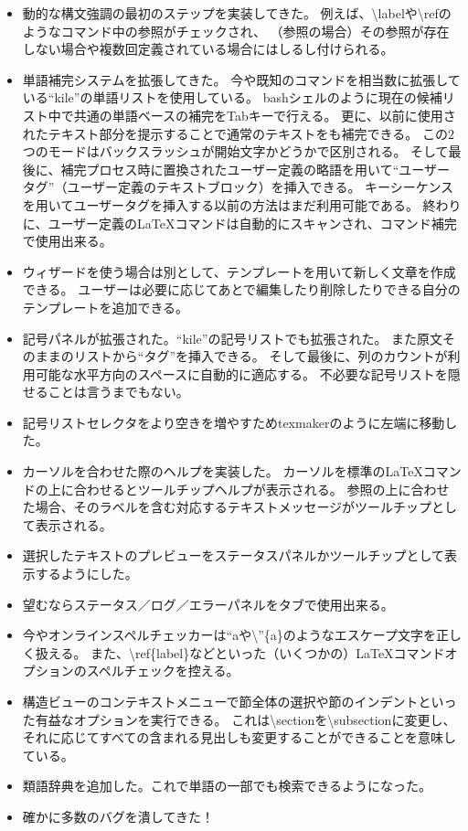 \documentclass[]{book}
\begin{document}
\begin{itemize}
\item
  動的な構文強調の最初のステップを実装してきた。
  例えば、\textbackslash{}labelや\textbackslash{}refのようなコマンド中の参照がチェックされ、
  （参照の場合）その参照が存在しない場合や複数回定義されている場合にはしるし付けられる。
\item
  単語補完システムを拡張してきた。
  今や既知のコマンドを相当数に拡張している``kile''の単語リストを使用している。
  bashシェルのように現在の候補リスト中で共通の単語ベースの補完をTabキーで行える。
  更に、以前に使用されたテキスト部分を提示することで通常のテキストをも補完できる。
  この2つのモードはバックスラッシュが開始文字かどうかで区別される。
  そして最後に、補完プロセス時に置換されたユーザー定義の略語を用いて``ユーザータグ''（ユーザー定義のテキストブロック）を挿入できる。
  キーシーケンスを用いてユーザータグを挿入する以前の方法はまだ利用可能である。
  終わりに、ユーザー定義のLaTeXコマンドは自動的にスキャンされ、コマンド補完で使用出来る。
\item
  ウィザードを使う場合は別として、テンプレートを用いて新しく文章を作成できる。
  ユーザーは必要に応じてあとで編集したり削除したりできる自分のテンプレートを追加できる。
\item
  記号パネルが拡張された。``kile''の記号リストでも拡張された。
  また原文そのままのリストから``タグ''を挿入できる。
  そして最後に、列のカウントが利用可能な水平方向のスペースに自動的に適応する。
  不必要な記号リストを隠せることは言うまでもない。
\item
  記号リストセレクタをより空きを増やすためtexmakerのように左端に移動した。
\item
  カーソルを合わせた際のヘルプを実装した。
  カーソルを標準のLaTeXコマンドの上に合わせるとツールチップヘルプが表示される。
  参照の上に合わせた場合、そのラベルを含む対応するテキストメッセージがツールチップとして表示される。
\item
  選択したテキストのプレビューをステータスパネルかツールチップとして表示するようにした。
\item
  望むならステータス／ログ／エラーパネルをタブで使用出来る。
\item
  今やオンラインスペルチェッカーは``aや\textbackslash{}''\{a\}のようなエスケープ文字を正しく扱える。
  また、\textbackslash{}ref\{label\}などといった（いくつかの）LaTeXコマンドオプションのスペルチェックを控える。
\item
  構造ビューのコンテキストメニューで節全体の選択や節のインデントといった有益なオプションを実行できる。
  これは\textbackslash{}sectionを\textbackslash{}subsectionに変更し、それに応じてすべての含まれる見出しも変更することができることを意味している。
\item
  類語辞典を追加した。これで単語の一部でも検索できるようになった。
\item
  確かに多数のバグを潰してきた！
\end{itemize}
\end{document}
